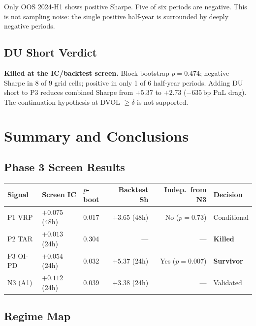 \documentclass[12pt, a4paper]{article}
\theoremstyle{plain}
\theoremstyle{definition}
\newcommand{\bp}{\,\mathrm{bp}}
\begin{document}
Only OOS 2024-H1 shows positive Sharpe.  Five of six periods are negative.
This is not sampling noise: the single positive half-year is surrounded
by deeply negative periods.

\subsection{DU Short Verdict}

\textbf{Killed at the IC/backtest screen.}  Block-bootstrap $p = 0.474$;
negative Sharpe in 8 of 9 grid cells; positive in only 1 of 6
half-year periods.  Adding DU short to P3 reduces combined Sharpe from
$+5.37$ to $+2.73$ ($-635\bp$ PnL drag).  The continuation hypothesis
at DVOL $\geq \delta$ is not supported.

\section{Summary and Conclusions}
\label{sec:summary}

\subsection{Phase 3 Screen Results}

\begin{center}
\begin{tabular}{lllrrl}
\toprule
Signal & Screen IC & $p$-boot & Backtest Sh & Indep.\ from N3 & Decision \\
\midrule
P1 VRP  & $+0.075$ (48h) & 0.017 & $+3.65$ (48h) & No ($p=0.73$) & Conditional \\
P2 TAR  & $+0.013$ (24h) & 0.304 & --- & --- & \textbf{Killed} \\
P3 OI-PD & $+0.054$ (24h) & 0.032 & $+5.37$ (24h) & Yes ($p=0.007$) & \textbf{Survivor} \\
\midrule
N3 (A1) & $+0.112$ (24h) & 0.039 & $+3.38$ (24h) & --- & Validated \\
\bottomrule
\end{tabular}
\end{center}

\subsection{Regime Map}
\end{document}
